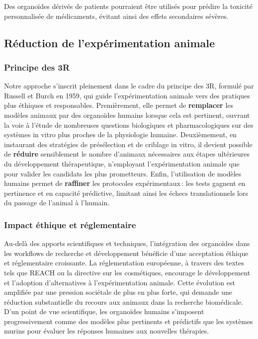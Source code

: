 Des organoïdes dérivés de patients pourraient être utilisés pour prédire la toxicité personnalisée de médicaments, évitant ainsi des effets secondaires sévères.

\subsection{Réduction de l'expérimentation animale}

\subsubsection{Principe des 3R}

Notre approche s’inscrit pleinement dans le cadre du principe des 3R, formulé par Russell et Burch en 1959, qui guide l’expérimentation animale vers des pratiques plus éthiques et responsables. Premièrement, elle permet de \textbf{remplacer} les modèles animaux par des organoïdes humains lorsque cela est pertinent, ouvrant la voie à l’étude de nombreuses questions biologiques et pharmacologiques sur des systèmes in vitro plus proches de la physiologie humaine. Deuxièmement, en instaurant des stratégies de présélection et de criblage in vitro, il devient possible de \textbf{réduire} sensiblement le nombre d’animaux nécessaires aux étapes ultérieures du développement thérapeutique, n’employant l’expérimentation animale que pour valider les candidats les plus prometteurs. Enfin, l’utilisation de modèles humains permet de \textbf{raffiner} les protocoles expérimentaux : les tests gagnent en pertinence et en capacité prédictive, limitant ainsi les échecs translationnels lors du passage de l’animal à l’humain.

\subsubsection{Impact éthique et réglementaire}

Au-delà des apports scientifiques et techniques, l’intégration des organoïdes dans les workflows de recherche et développement bénéficie d’une acceptation éthique et réglementaire croissante. La réglementation européenne, à travers des textes tels que REACH ou la directive sur les cosmétiques, encourage le développement et l’adoption d’alternatives à l’expérimentation animale. Cette évolution est amplifiée par une pression sociétale de plus en plus forte, qui demande une réduction substantielle du recours aux animaux dans la recherche biomédicale. D’un point de vue scientifique, les organoïdes humains s’imposent progressivement comme des modèles plus pertinents et prédictifs que les systèmes murins pour évaluer les réponses humaines aux nouvelles thérapies.

